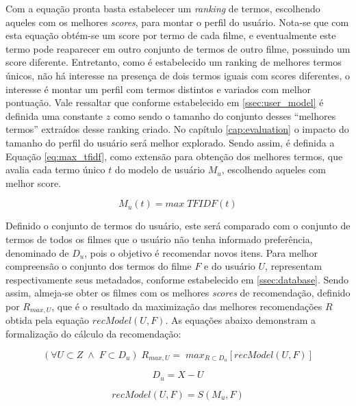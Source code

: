 Com a equação pronta basta estabelecer um \textit{ranking} de termos, escolhendo aqueles com os melhores \textit{scores}, para montar o perfil do usuário. Nota-se que com esta equação obtém-se um score por termo de cada filme, e eventualmente este termo pode reaparecer em outro conjunto de termos de outro filme, possuindo um score diferente. Entretanto, como é estabelecido um ranking de melhores termos únicos, não há interesse na presença de dois termos iguais com scores diferentes, o interesse é montar um perfil com termos distintos e variados com melhor pontuação. Vale ressaltar que conforme estabelecido em \ref{ssec:user_model} é definida uma constante $z$ como sendo o tamanho do conjunto desses \enquote{melhores termos} extraídos desse ranking criado. No capítulo \ref{cap:evaluation} o impacto do tamanho do perfil do usuário será melhor explorado.  Sendo assim, é definida a Equação \ref{eq:max_tfidf}, como extensão para obtenção dos melhores termos, que avalia cada termo único $t$ do modelo de usuário $M_u$, escolhendo aqueles com melhor score.

\begin{equation}
	M_u(t) = max \; TFIDF(t)
\label{eq:max_tfidf}
\end{equation}

Definido o conjunto de termos do usuário, este será comparado com o conjunto de termos de todos os filmes que o usuário não tenha informado preferência, denominado de $D_u$, pois o objetivo é recomendar novos itens. Para melhor compreensão o conjunto dos termos do filme $F$ e do usuário $U$, representam respectivamente seus metadados, conforme estabelecido em \ref{ssec:database}. Sendo assim, almeja-se obter os filmes com os melhores \textit{scores} de recomendação, definido por $R_{max, U}$, que é o resultado da maximização das melhores recomendações $R$ obtida pela equação $recModel(U, F)$. As equações abaixo demonstram a formalização do cálculo da recomendação:

\begin{equation}
	(\forall U \subset Z\; \land \; F \subset D_u)\; R_{max, U} = \; max_{R \subset D_u}[recModel(U, F)]
\label{eq:rec_model_max}
\end{equation}

\begin{equation}
	D_u = X - U
\label{eq:rec_model_movies}
\end{equation}

\begin{equation}
	recModel(U, F) = S(M_u, F)
\label{eq:rec_model_eq}
\end{equation}

